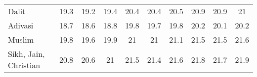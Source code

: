 \begin{tabular}{l*{9}{c}}
Dalit               &        19.3&        19.2&        19.4&        20.4&        20.4&        20.5&        20.9&        20.9&          21\\
Adivasi             &        18.7&        18.6&        18.8&        19.8&        19.7&        19.8&        20.2&        20.1&        20.2\\
Muslim              &        19.8&        19.6&        19.9&          21&          21&        21.1&        21.5&        21.5&        21.6\\
Sikh, Jain, Christian&        20.8&        20.6&          21&        21.5&        21.4&        21.6&        21.8&        21.7&        21.9\\
\bottomrule
\end{tabular}
